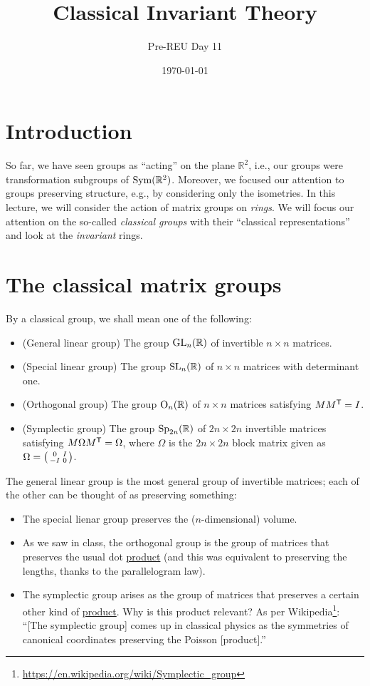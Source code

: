 \documentclass[12pt]{article}
\title{Classical Invariant Theory}
\author{Pre-REU Day 11}
\date{\today}
\begin{document}
\maketitle

\section*{Introduction} 

	So far, we have seen groups as ``acting'' on the plane $\mathbb{R}^{2}$, 
	i.e., 
	our groups were transformation subgroups of $\operatorname{Sym}(\mathbb{R}^{2})$. 
	Moreover, we focused our attention to groups preserving structure, 
	e.g., 
	by considering only the isometries. 
	In this lecture, we will consider the action of matrix groups on \emph{rings}. 
	We will focus our attention on the so-called \emph{classical groups} with their ``classical representations'' and look at the \emph{invariant} rings. 

\section{The classical matrix groups}
	
	By a classical group, we shall mean one of the following:
	\begin{itemize}
		\item (General linear group) The group $\operatorname{GL}_{n}(\mathbb{R})$ of invertible $n \times n$ matrices.
		\item (Special linear group) The group $\operatorname{SL}_{n}(\mathbb{R})$ of $n \times n$ matrices with determinant one.
		\item (Orthogonal group) The group $\operatorname{O}_{n}(\mathbb{R})$ of $n \times n$ matrices satisfying $M M^{\mathsf{T}} = I$.
		\item (Symplectic group) The group $\operatorname{Sp}_{2n}(\mathbb{R})$ of $2n \times 2n$ invertible matrices satisfying $M \Omega M^{\mathsf{T}} = \Omega$, 
		where $\Omega$ is the $2n \times 2n$ block matrix given as 
		$\Omega = \left(\begin{smallmatrix} 0 & I \\ -I & 0 \end{smallmatrix}\right)$. 
	\end{itemize}
	
	The general linear group is the most general group of invertible matrices; 
	each of the other can be thought of as preserving something:
	\begin{itemize}
		\item The special lienar group preserves the ($n$-dimensional) volume.
		\item As we saw in class, the orthogonal group is the group of matrices that preserves the usual dot \underline{product} (and this was equivalent to preserving the lengths, thanks to the parallelogram law). 
		\item The symplectic group arises as the group of matrices that preserves a certain other kind of \underline{product}. 
		Why is this product relevant? 
		As per Wikipedia\footnote{\url{https://en.wikipedia.org/wiki/Symplectic_group}}: ``[The symplectic group] comes up in classical physics as the symmetries of canonical coordinates preserving the Poisson [product].''
	\end{itemize}
\end{document}
